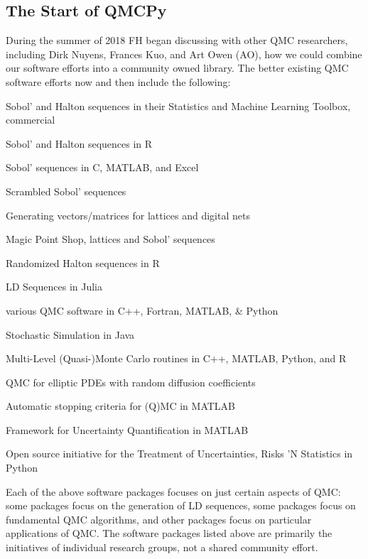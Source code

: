 \documentclass[11pt]{NSFamsart}
\begin{document}
\subsection{The Start of QMCPy}
During the summer of 2018 FH began discussing with other QMC researchers, including Dirk Nuyens, Frances Kuo, and Art Owen (AO), how we could combine our software efforts into a community owned library.  The better existing QMC software efforts now and then include the following:
\begin{description}[format=\textup]
	\item[MATLAB] Sobol' and Halton sequences in their Statistics and Machine Learning Toolbox, commercial \cite{MAT9.8}
	\item [qrng]  Sobol' and Halton sequences in R \cite{QRNG2020}
	\item[BRODA] Sobol' sequences in C, MATLAB, and Excel \cite{BRODA20a}
	\item[PyTorch] Scrambled Sobol' sequences \cite{PyTorch}
	\item[LatNet Builder] Generating vectors/matrices for lattices and digital nets \cite{LatNet}
	\item[MPS] Magic Point Shop, lattices and Sobol' sequences \cite{Nuy17a}
	\item[Owen] Randomized Halton sequences in R \cite{Owe20a}
	\item[Robbe] LD Sequences in Julia \cite{Rob20a}
	\item[Burkhardt] various QMC software in C++, Fortran, MATLAB, \& Python \cite{Bur20a}
	\item[SSJ] Stochastic Simulation in Java \cite{SSJ}
	\item[ML(Q)MC] Multi-Level (Quasi-)Monte Carlo routines in C++, MATLAB, Python, and R \cite{GilesSoft}
	\item[QMC4PDE] QMC for elliptic PDEs with random diffusion coefficients \cite{KuoNuy16a}
	\item[GAIL] Automatic stopping criteria for (Q)MC in MATLAB \cite{ChoEtal20a}
	\item[UQLab] Framework for Uncertainty Quantification in MATLAB \cite{UQLab2014}
	\item[OpenTURNS] Open source initiative for the Treatment of Uncertainties, Risks 'N Statistics in Python \cite{OpenTURNS}
\end{description}
Each of the above software packages focuses on just certain aspects of QMC: some packages focus on the generation of LD sequences, some packages focus on fundamental QMC algorithms, and other packages focus on particular applications of QMC.  The software packages listed above are primarily the initiatives of individual research groups, not a shared community effort.
\end{document}
